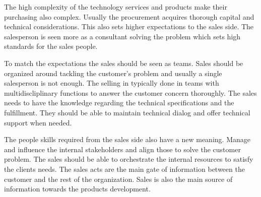 \documentclass[12pt,a4paper,oneside,pdftex]{report}
\begin{document}
{{The high complexity of the technology services and products make their purchasing also complex. Usually the procurement acquires thorough capital and technical considerations. This also sets higher expectations to the sales side. The salesperson is seen more as a consultant solving the problem which sets high standards for the sales people. \citep{Sharma}

To match the expectations the sales should be seen as teams. Sales should be organized around tackling the customer's problem and usually a single salesperson is not enough. The selling in typically done in teams with multidiscliplinary functions to answer the customer concern thoroughly. The sales needs to have the knowledge regarding the technical specifications and the fulfillment. They should be able to maintain technical dialog and offer technical support when needed.  \citep{Sharma}

The people skills required from the sales side also have a new meaning. Manage and influence the internal stakeholders and align those to solve the customer problem. The sales should be able to orchestrate the internal resources to satisfy the clients needs. The sales acts are the main gate of information between the customer and the rest of the organization. Sales is also the main source of information towards the products development.  \citep{Sharma}

}}
\end{document}
